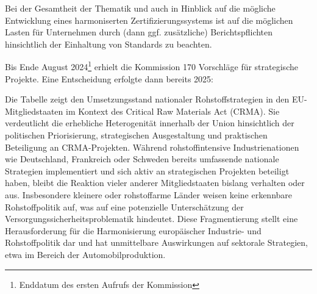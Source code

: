 \documentclass[12pt,a4paper,oneside]{book} %
\begin{document}
Bei der Gesamtheit der Thematik und auch in Hinblick auf die mögliche Entwicklung eines harmoniserten Zertifizierungssystems ist auf die möglichen Lasten für Unternehmen durch (dann ggf. zusätzliche) Berichtspflichten hinsichtlich der Einhaltung von Standards zu beachten.\autocite{EuZW 2025, 413, 417}

Bis Ende August 2024\footnote{Enddatum des ersten Aufrufs der Kommission} erhielt die Kommission 170 Vorschläge für strategische Projekte. Eine Entscheidung erfolgte dann bereits 2025:

Die Tabelle zeigt den Umsetzungsstand nationaler Rohstoffstrategien in den EU-Mitgliedstaaten im Kontext des Critical Raw Materials Act (CRMA). Sie verdeutlicht die erhebliche Heterogenität innerhalb der Union hinsichtlich der politischen Priorisierung, strategischen Ausgestaltung und praktischen Beteiligung an CRMA-Projekten. Während rohstoffintensive Industrienationen wie Deutschland, Frankreich oder Schweden bereits umfassende nationale Strategien implementiert und sich aktiv an strategischen Projekten beteiligt haben, bleibt die Reaktion vieler anderer Mitgliedstaaten bislang verhalten oder aus. Insbesondere kleinere oder rohstoffarme Länder weisen keine erkennbare Rohstoffpolitik auf, was auf eine potenzielle Unterschätzung der Versorgungssicherheitsproblematik hindeutet. Diese Fragmentierung stellt eine Herausforderung für die Harmonisierung europäischer Industrie- und Rohstoffpolitik dar und hat unmittelbare Auswirkungen auf sektorale Strategien, etwa im Bereich der Automobilproduktion.
\end{document}
